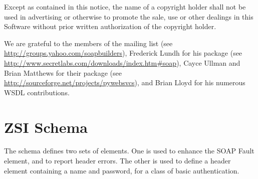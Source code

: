 \documentclass{manual}
\begin{document}
Except as contained in this notice, the name of a copyright holder
shall not be used in advertising or otherwise to promote the sale, use
or other dealings in this Software without prior written authorization
of the copyright holder.

\vfill

\centerline{}

We are grateful to the members of the 
mailing list (see \url{http://groups.yahoo.com/soapbuilders}),
Frederick Lundh for his  package (see
\url{http://www.secretlabs.com/downloads/index.htm\#soap}),
Cayce Ullman and Brian Matthews for their  package
(see \url{http://sourceforge.net/projects/pywebsvcs}),
and Brian Lloyd for his numerous WSDL contributions.

\tableofcontents{}
\def\ZSI{\module{ZSI}}













\chapter{ZSI Schema}

The \ZSI{} schema defines two sets of elements.  One is used to enhance
the SOAP Fault  element, and to report header errors.
The other is used to define a header element containing a name and
password, for a class of basic authentication.

\ifx\htmlonly\undefined\else\usepackage{verbatim}\fi

\end{document}
